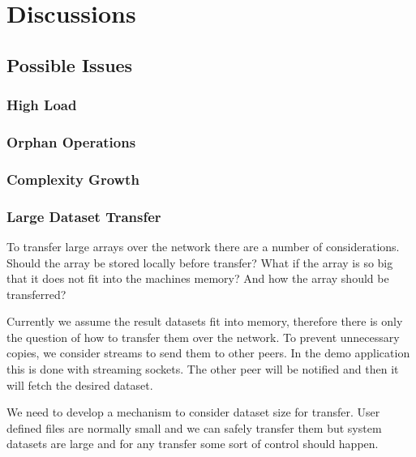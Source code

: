 \chapter{Discussions}
\label{cha:discussions}

\section{Possible Issues}
\subsection{High Load}
\subsection{Orphan Operations}
\subsection{Complexity Growth}

\subsection{Large Dataset Transfer}
To transfer large arrays over the network there are a number of considerations. Should the array be stored locally before transfer?
What if the array is so big that it does not fit into the machines memory? And how the array should be transferred?

Currently we assume the result datasets fit into memory, therefore there is only the question of how 
to transfer them over the network. To prevent unnecessary copies, we consider streams to send them to
other peers. In the demo application this is done with streaming sockets. The other peer will be notified and then it will fetch the desired dataset.

We need to develop a mechanism to consider dataset size for transfer. User defined files are normally small and we can safely transfer them but
system datasets are large and for any transfer some sort of control should happen.